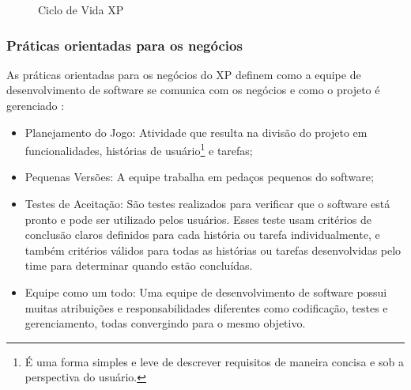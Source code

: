         \begin{figure}[!htb]
	        \centering
	        \begin{minipage}{\wd0}
		        \caption{Ciclo de Vida XP}
		        \label{fig:cicloXP}
	        \end{minipage}
        \end{figure}
        
            \subsubsection{Práticas orientadas para os negócios}
        
            As práticas orientadas para os negócios do XP definem como a equipe de desenvolvimento de software se comunica com os negócios e como o projeto é gerenciado \cite{Martin2020}:
            \begin{itemize}
                \item Planejamento do Jogo: Atividade que resulta na divisão do projeto em funcionalidades, histórias de usuário\footnote{É uma forma simples e leve de descrever requisitos de maneira concisa e sob a perspectiva do usuário.} e tarefas;
                \item Pequenas Versões: A equipe trabalha em pedaços pequenos do software;
                \item Testes de Aceitação: São testes realizados para verificar que o software está pronto e pode ser utilizado pelos usuários. Esses teste usam critérios de conclusão claros definidos para cada história ou tarefa individualmente, e também critérios válidos para todas as histórias ou tarefas desenvolvidas pelo time para determinar quando estão concluídas.
                \item Equipe como um todo: Uma equipe de desenvolvimento de software possui muitas atribuições e responsabilidades diferentes como codificação, testes e gerenciamento, todas convergindo para o mesmo objetivo.
            \end{itemize}
        
